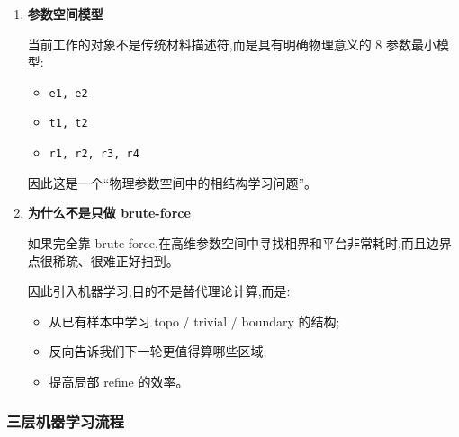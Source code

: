 \documentclass[lang=cn,scheme=chinese,color=blue,device=normal,toc=onecol,math=cm]{elegantbook}
\begin{document}
\begin{enumerate}
\item \textbf{参数空间模型}\par
 
当前工作的对象不是传统材料描述符,而是具有明确物理意义的 8 参数最小模型:\par
 
\begin{itemize}
\item \texttt{e1, e2}
\item \texttt{t1, t2}
\item \texttt{r1, r2, r3, r4}
\end{itemize}
 
因此这是一个“物理参数空间中的相结构学习问题”。\par
\item \textbf{为什么不是只做 brute-force}\par
 
如果完全靠 brute-force,在高维参数空间中寻找相界和平台非常耗时,而且边界点很稀疏、很难正好扫到。\par
 
因此引入机器学习,目的不是替代理论计算,而是:\par
 
\begin{itemize}
\item 从已有样本中学习 topo /\allowbreak{} trivial /\allowbreak{} boundary 的结构;
\item 反向告诉我们下一轮更值得算哪些区域;
\item 提高局部 refine 的效率。
\end{itemize}
\end{enumerate}


\subsubsection{三层机器学习流程}
\end{document}
